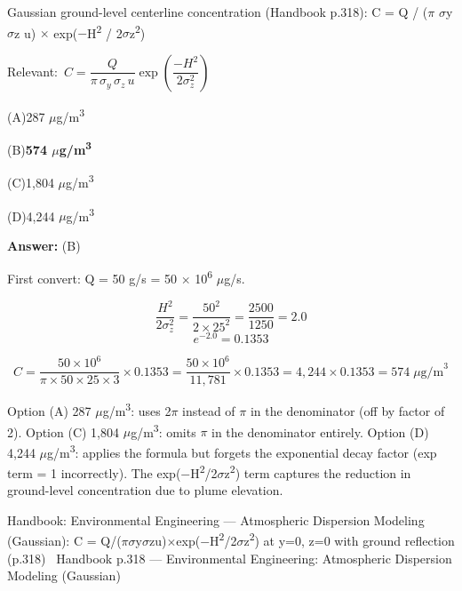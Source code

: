 \documentclass[11pt]{article}
\newcommand{\correct}[1]{\textbf{#1}\;{\color{accent}$\checkmark$}}
\newcommand{\optline}[2]{\par\noindent\hspace{1.2em}(#1)\hspace{0.6em}#2}
\begin{document}
Gaussian ground-level centerline concentration (Handbook p.318):
C = Q / ($\pi$ $\sigma$y $\sigma$z u) $\times$ exp($-$H\textsuperscript{2} / 2$\sigma$z\textsuperscript{2})\par\vspace{3pt}
{\small\color{soft}Relevant:}\ $C = \dfrac{Q}{\pi\,\sigma_y\,\sigma_z\,u}\exp\!\left(\dfrac{-H^2}{2\sigma_z^2}\right)$\par\vspace{3pt}
\optline{A}{287 $\mu$g/m\textsuperscript{3}}
\optline{B}{\correct{574 $\mu$g/m\textsuperscript{3}}}
\optline{C}{1,804 $\mu$g/m\textsuperscript{3}}
\optline{D}{4,244 $\mu$g/m\textsuperscript{3}}
\par\vspace{3pt}
\vspace{2pt}\par\noindent\colorbox{boxbg}{\parbox{\dimexpr\linewidth-2\fboxsep\relax}{%
\vspace{2pt}\textbf{Answer:} (B)\par\vspace{2pt}
{\small First convert: Q = 50 g/s = 50 $\times$ 10\textsuperscript{6} $\mu$g/s.

\[\frac{H^2}{2\sigma_z^2} = \frac{50^2}{2\times25^2} = \frac{2500}{1250} = 2.0\]
\[e^{-2.0} = 0.1353\]

\[C = \frac{50\times10^6}{\pi\times50\times25\times3} \times 0.1353 = \frac{50\times10^6}{11{,}781} \times 0.1353 = 4{,}244 \times 0.1353 = 574\;\mu\text{g/m}^3\]

Option (A) 287 $\mu$g/m\textsuperscript{3}: uses 2$\pi$ instead of $\pi$ in the denominator (off by factor of 2). Option (C) 1,804 $\mu$g/m\textsuperscript{3}: omits $\pi$ in the denominator entirely. Option (D) 4,244 $\mu$g/m\textsuperscript{3}: applies the formula but forgets the exponential decay factor (exp term = 1 incorrectly). The exp($-$H\textsuperscript{2}/2$\sigma$z\textsuperscript{2}) term captures the reduction in ground-level concentration due to plume elevation.}\par\vspace{2pt}
{\footnotesize\color{soft}Handbook: Environmental Engineering --- Atmospheric Dispersion Modeling (Gaussian): C = Q/($\pi$$\sigma$y$\sigma$zu)$\times$exp($-$H\textsuperscript{2}/2$\sigma$z\textsuperscript{2}) at y=0, z=0 with ground reflection (p.318) \textbullet\ Handbook p.318 --- Environmental Engineering: Atmospheric Dispersion Modeling (Gaussian)}\vspace{2pt}
}}
\vspace{9pt}
\end{document}
